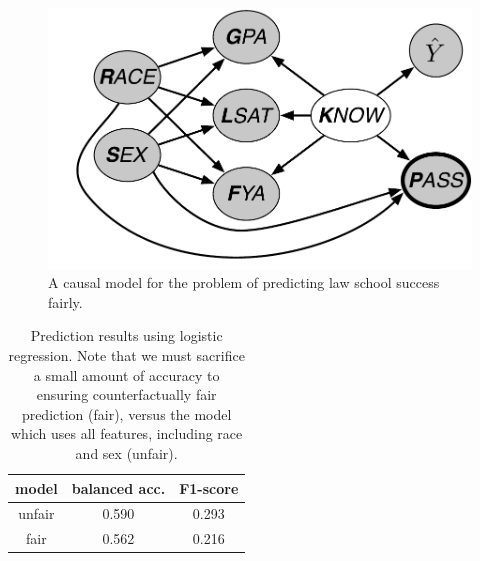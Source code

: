 \begin{figure}[th]
\begin{center}
\vspace{-1ex}
\centerline{\includegraphics[width=\columnwidth]{law_school_model}}
\vspace{-2ex}
\caption{A causal model for the problem of predicting law school success fairly.\label{figure.law_school}}
\vspace{-2ex}
\end{center}
\end{figure}

\begin{table}[t]
\vspace{-2ex}
\caption{Prediction results using logistic regression. Note that we must sacrifice a small amount of accuracy to ensuring counterfactually fair prediction (fair), versus the model which uses all features, including race and sex (unfair).}
\vspace{-3ex}
\label{table.pred_law}
\begin{center}
\resizebox{\columnwidth}{!}
{
\begin{sc}
\footnotesize
\begin{tabular}{c|c|c}
\hline
\hline
model & balanced acc. & F1-score  \\
\hline
unfair & 0.590 & 0.293 \\ \hline
fair  &  0.562 & 0.216 \\
\hline
\end{tabular}
\end{sc}
}
\end{center}
\vspace{-4ex}
\end{table}


